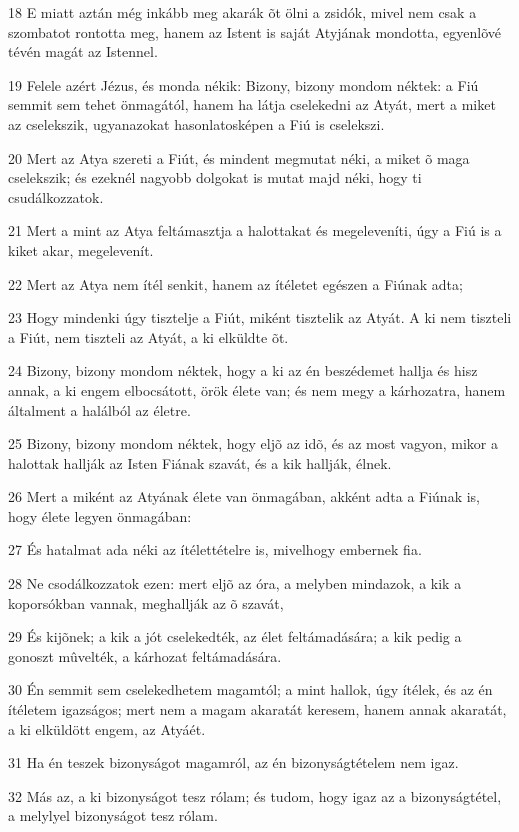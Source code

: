 \par 18 E miatt aztán még inkább meg akarák õt ölni a zsidók, mivel nem csak a szombatot rontotta meg, hanem az Istent is saját Atyjának mondotta, egyenlõvé tévén magát az Istennel.
\par 19 Felele azért Jézus, és monda nékik: Bizony, bizony mondom néktek: a Fiú semmit sem tehet önmagától, hanem ha látja  cselekedni az Atyát, mert a miket az cselekszik, ugyanazokat hasonlatosképen a Fiú is cselekszi.
\par 20 Mert az Atya szereti a Fiút, és mindent megmutat néki, a miket õ maga cselekszik; és ezeknél nagyobb dolgokat is mutat majd néki, hogy ti csudálkozzatok.
\par 21 Mert a mint az Atya feltámasztja a halottakat és megeleveníti, úgy a Fiú is a kiket akar, megelevenít.
\par 22 Mert az Atya nem ítél senkit, hanem az ítéletet egészen a Fiúnak adta;
\par 23 Hogy mindenki úgy tisztelje a Fiút, miként tisztelik az Atyát. A ki nem tiszteli a Fiút, nem tiszteli az Atyát, a ki elküldte õt.
\par 24 Bizony, bizony mondom néktek, hogy a ki az én beszédemet hallja és hisz annak, a ki engem elbocsátott, örök élete van; és nem megy a kárhozatra, hanem  általment a halálból az életre.
\par 25 Bizony, bizony mondom néktek, hogy eljõ az idõ, és az most vagyon, mikor a halottak hallják az Isten Fiának szavát, és a kik hallják, élnek.
\par 26 Mert a miként az Atyának élete van önmagában, akként adta a Fiúnak is, hogy élete legyen önmagában:
\par 27 És hatalmat ada néki az ítélettételre is, mivelhogy embernek fia.
\par 28 Ne csodálkozzatok ezen: mert eljõ az óra, a melyben mindazok, a kik a koporsókban vannak, meghallják az õ szavát,
\par 29 És kijõnek; a kik a jót cselekedték, az élet feltámadására; a kik pedig a gonoszt mûvelték, a kárhozat feltámadására.
\par 30 Én semmit sem cselekedhetem magamtól; a mint hallok, úgy ítélek, és az én ítéletem igazságos; mert nem a magam akaratát keresem, hanem annak  akaratát, a ki elküldött engem, az Atyáét.
\par 31 Ha én teszek bizonyságot magamról, az én bizonyságtételem nem igaz.
\par 32 Más az, a ki bizonyságot tesz rólam; és tudom, hogy igaz az a bizonyságtétel, a melylyel bizonyságot tesz rólam.
